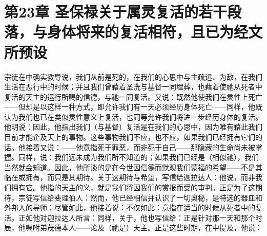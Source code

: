
\section{第23章 圣保禄关于属灵复活的若干段落，与身体将来的复活相符，且已为经文所预设}

宗徒在中确实教导说，我们从前是死的，在我们的心思中与主疏远、为敌，在我们生活在恶行中的时候；并且我们曾藉着圣洗与基督一同埋葬，也藉着使祂从死者中复活的天主的运行所赐的信德，与祂一同复活。又说：既然他使我们在灵性上死亡——但却是以这样一种方式，即允许我们有一天必须经历身体死亡——同样，他既认为我们也已在类似灵性意义上复活，也同等允许我们将进一步经历身体的复活。他明说：因此，他指出我们（与基督）复活是在我们的心思中，因为唯有藉此我们目前才能企及天上的事物。这些事物我们不应，也不应，如果我们已经拥有它们的话。他接着又说：——他意指死于罪恶，而非死于自己——那隐藏的生命尚未被掌握。同样，说：我们远未成为我们所不知道的；如果我们已经是（相似祂），我们当然就会知道。因此，他所谈的是在今世因信德而默观我们蒙福的希望——不是其临在或拥有，而只是其期待。关于这期待与希望，写信给迦拉达人：他说，而非我们拥有它。他指的天主的义，就是我们将因我们的赏报而受的审判。正是为了这期待，宗徒写信给斐理伯人：然而，他已经相信并认识了一切奥秘，是特选的器皿和外邦人的导师；尽管如此，他接着说：不仅如此：意指在适当的时候从死者中的复活。正如他对迦拉达人所言：同样，关于，他也写信给：正是针对那一天和那个时辰，他嘱咐弟茂德本人——论及（祂是）天主。正是这些时期，在中提及，他说：\par

